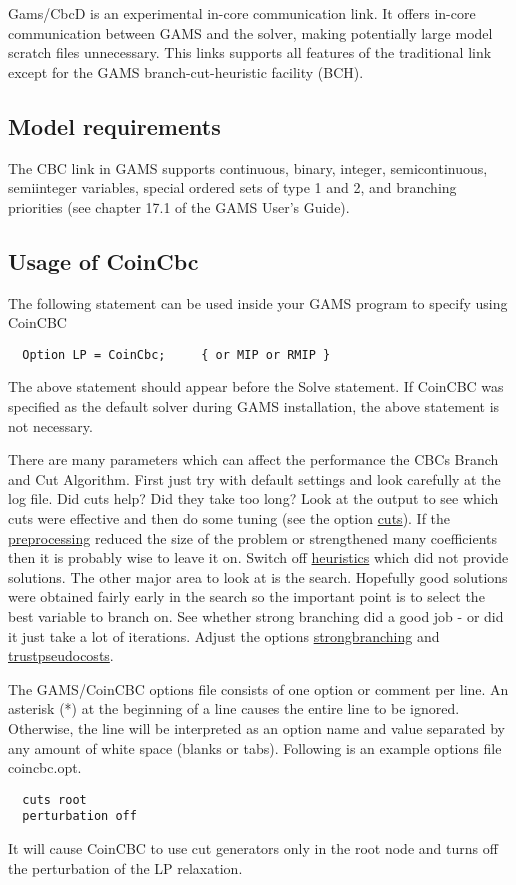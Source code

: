 Gams/CbcD is an experimental in-core communication link.
It offers in-core communication between GAMS and the solver, making potentially large model scratch files unnecessary.
This links supports all features of the traditional link except for the GAMS branch-cut-heuristic facility (BCH).

\subsection{Model requirements}

The CBC link in GAMS supports continuous, binary, integer, semicontinuous, semiinteger variables, special ordered sets of type 1 and 2, and branching priorities (see chapter 17.1 of the GAMS User's Guide).

\subsection{Usage of CoinCbc}

The following statement can be used inside your GAMS program to specify using CoinCBC
\begin{verbatim}
  Option LP = CoinCbc;     { or MIP or RMIP }
\end{verbatim}

The above statement should appear before the Solve statement.
If CoinCBC was specified as the default solver during GAMS installation, the above statement is not necessary.

There are many parameters which can affect the performance the CBCs Branch and Cut Algorithm.
First just try with default settings and look carefully at the log file.
Did cuts help? Did they take too long? Look at the output to see which cuts were effective and then do some tuning (see the option \hyperlink{cuts}{cuts}).
If the \hyperlink{preprocess}{preprocessing} reduced the size of the problem or strengthened many coefficients then it is probably wise to leave it on.
Switch off \hyperlink{heuristics}{heuristics} which did not provide solutions.
The other major area to look at is the search. Hopefully good solutions were obtained fairly early in the search so the important point is to select the best variable to branch on.
See whether strong branching did a good job - or did it just take a lot of iterations.
Adjust the options \hyperlink{strongbranching}{strongbranching} and \hyperlink{trustpseudocosts}{trustpseudocosts}.

The GAMS/CoinCBC options file consists of one option or comment per line.
An asterisk (*) at the beginning of a line causes the entire line to be ignored.
Otherwise, the line will be interpreted as an option name and value separated by any amount of white space (blanks or tabs).
Following is an example options file coincbc.opt.
\begin{verbatim}
  cuts root
  perturbation off
\end{verbatim}
It will cause CoinCBC to use cut generators only in the root node and turns off the perturbation of the LP relaxation.


